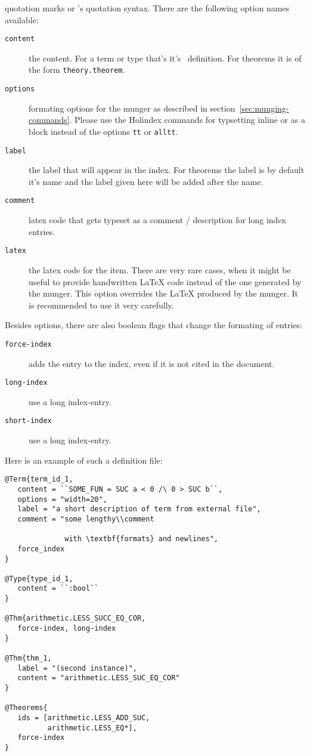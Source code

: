 quotation marks or \HOL{}'s quotation syntax. There are the following
option names available:
\begin{description}
  \item[\texttt{content}]
    the content. For a term or type that's it's \HOL{}\ definition.
    For theorems it is of the form \texttt{theory.theorem}.
  \item[\texttt{options}]
    formating options for the munger as described in section~\ref{sec:munging-commands}.
    Please use the Holindex commands for typsetting inline or as a block instead
    of the options \texttt{tt} or \texttt{alltt}.
  \item[\texttt{label}] the label that will appear in the index. For
    theorems the label is by default it's name and the label given here
    will be added after the name.
  \item[\texttt{comment}] latex code that gets typeset as a comment / description
    for long index entries.
  \item[\texttt{latex}] the latex code for the item. There are very rare cases,
    when it might be useful to provide handwritten \LaTeX{} code instead of the one
    generated by the munger. This option overrides the \LaTeX{} produced by the munger.
    It is recommended to use it very carefully.
\end{description}
Besides options, there are also boolean flags that change the formating of entries:
\begin{description}
  \item[\texttt{force-index}]
    adds the entry to the index, even if it is not cited in the document.
  \item[\texttt{long-index}]
    use a long index-entry.
  \item[\texttt{short-index}]
    use a long index-entry.
\end{description}
Here is an example of such a \HOL{} definition file:

\begin{verbatim}
@Term{term_id_1,
   content = ``SOME_FUN = SUC a < 0 /\ 0 > SUC b``,
   options = "width=20",
   label = "a short description of term from external file",
   comment = "some lengthy\\comment

              with \textbf{formats} and newlines",
   force_index
}

@Type{type_id_1,
   content = ``:bool``
}

@Thm{arithmetic.LESS_SUCC_EQ_COR,
   force-index, long-index
}

@Thm{thm_1,
   label = "(second instance)",
   content = "arithmetic.LESS_SUC_EQ_COR"
}

@Theorems{
   ids = [arithmetic.LESS_ADD_SUC,
          arithmetic.LESS_EQ*],
   force-index
}
\end{verbatim}


